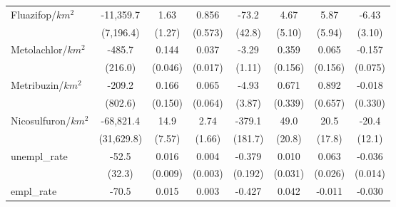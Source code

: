 \begin{table}[htbp]
\begin{tabular}{lccccccc}
      Fluazifop/$km^2$          & -11,359.7               & 1.63                    & 0.856                   & -73.2                   & 4.67                    & 5.87                    & -6.43\\   
                                & (7,196.4)               & (1.27)                  & (0.573)                 & (42.8)                  & (5.10)                  & (5.94)                  & (3.10)\\   
      Metolachlor/$km^2$        & -485.7                  & 0.144                   & 0.037                   & -3.29                   & 0.359                   & 0.065                   & -0.157\\   
                                & (216.0)                 & (0.046)                 & (0.017)                 & (1.11)                  & (0.156)                 & (0.156)                 & (0.075)\\   
      Metribuzin/$km^2$         & -209.2                  & 0.166                   & 0.065                   & -4.93                   & 0.671                   & 0.892                   & -0.018\\   
                                & (802.6)                 & (0.150)                 & (0.064)                 & (3.87)                  & (0.339)                 & (0.657)                 & (0.330)\\   
      Nicosulfuron/$km^2$       & -68,821.4               & 14.9                    & 2.74                    & -379.1                  & 49.0                    & 20.5                    & -20.4\\   
                                & (31,629.8)              & (7.57)                  & (1.66)                  & (181.7)                 & (20.8)                  & (17.8)                  & (12.1)\\   
      unempl\_rate              & -52.5                   & 0.016                   & 0.004                   & -0.379                  & 0.010                   & 0.063                   & -0.036\\   
                                & (32.3)                  & (0.009)                 & (0.003)                 & (0.192)                 & (0.031)                 & (0.026)                 & (0.014)\\   
      empl\_rate                & -70.5                   & 0.015                   & 0.003                   & -0.427                  & 0.042                   & -0.011                  & -0.030\\   

\end{tabular}
\end{table}
